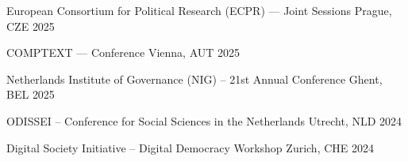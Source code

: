 






\vspace{1mm}

\begin{cvhonors}
\cvconf
{European Consortium for Political Research (ECPR) --- Joint Sessions} 
{Prague, CZE}
{2025}
\end{cvhonors}

\begin{cvhonors}
\cvconf
{COMPTEXT --- Conference} 
{Vienna, AUT}
{2025}
\end{cvhonors}

\begin{cvhonors}
\cvconf
{Netherlands Institute of Governance (NIG) -- 21st Annual Conference} 
{Ghent, BEL}
{2025}
\end{cvhonors}

\begin{cvhonors}
\cvconf
{ODISSEI -- Conference for Social Sciences in the Netherlands} 
{Utrecht, NLD}
{2024}
\end{cvhonors}

\begin{cvhonors}
\cvconf
{Digital Society Initiative -- Digital Democracy Workshop} 
{Zurich, CHE}
{2024}
\end{cvhonors}


